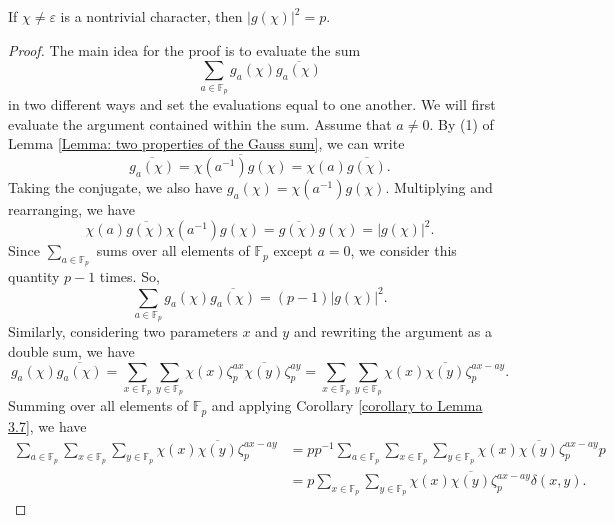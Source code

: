 \documentclass[10pt,a4paper]{amsart}
\begin{document}
\begin{lemma}\label{Lemma: value of the general Gauss sum}
    If $\chi\neq \varepsilon$ is a nontrivial character, then $|g(\chi)|^{2}=p$. 
\end{lemma}

\begin{proof}
    The main idea for the proof is to evaluate the sum 
    \begin{equation*}
        \sum_{a\in\mathbb{F}_{p}}g_{a}(\chi)\overline{g_{a}(\chi)}
    \end{equation*}
    in two different ways and set the evaluations equal to one another. We will first evaluate the argument contained within the sum. Assume that $a\neq 0$. By (1) of Lemma \ref{Lemma: two properties of the Gauss sum}, we can write 
    \begin{equation*}
        \overline{g_{a}(\chi)} = \overline{\chi(a^{-1})g(\chi)} = \chi(a)\overline{g(\chi)}.
    \end{equation*}
    Taking the conjugate, we also have $g_{a}(\chi) = \chi(a^{-1})g(\chi)$. Multiplying and rearranging, we have
    \begin{equation*}
    \chi(a)\overline{g(\chi)}\chi(a^{-1})g(\chi) = \overline{g(\chi)}g(\chi) = |g(\chi)|^{2}.
    \end{equation*}
    Since $\sum_{a\in\mathbb{F}_{p}}$ sums over all elements of $\mathbb{F}_{p}$ except $a=0$, we consider this quantity $p-1$ times. So,
    \begin{equation*}
        \sum_{a\in\mathbb{F}_{p}}g_{a}(\chi)\overline{g_{a}(\chi)} = (p-1)|g(\chi)|^{2}.
    \end{equation*}
    Similarly, considering two parameters $x$ and $y$ and rewriting the argument as a double sum, we have
    \begin{equation*}
        g_{a}(\chi)\overline{g_{a}(\chi)} = \sum_{x\in\mathbb{F}_{p}}\sum_{y\in\mathbb{F}_{p}}\chi(x)\zeta_{p}^{ax}\overline{\chi(y)}\zeta_{p}^{ay} = \sum_{x\in\mathbb{F}_{p}}\sum_{y\in\mathbb{F}_{p}}\chi(x)\overline{\chi(y)}\zeta_{p}^{ax-ay}.
    \end{equation*}
    Summing over all elements of $\mathbb{F}_{p}$ and applying Corollary \ref{corollary to Lemma 3.7}, we have
    \begin{align*}  \sum_{a\in\mathbb{F}_{p}}\sum_{x\in\mathbb{F}_{p}}\sum_{y\in\mathbb{F}_{p}}\chi(x)\overline{\chi(y)}\zeta_{p}^{ax-ay} & = pp^{-1}\sum_{a\in\mathbb{F}_{p}}\sum_{x\in\mathbb{F}_{p}}\sum_{y\in\mathbb{F}_{p}}\chi(x)\overline{\chi(y)}\zeta_{p}^{ax-ay}p \\ & = p\sum_{x\in\mathbb{F}_{p}}\sum_{y\in\mathbb{F}_{p}}\chi(x)\overline{\chi(y)}\zeta_{p}^{ax-ay}\delta(x,y).

\end{align*}
\end{proof}
\end{document}
